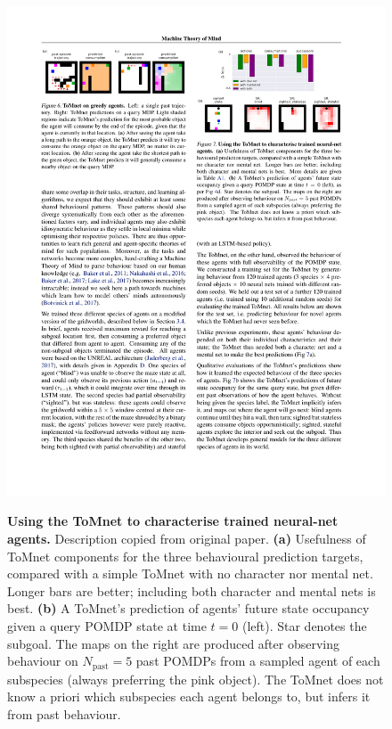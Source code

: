 \documentclass[twocolumn,superscriptaddress,aps]{revtex4-1}
\begin{document}
\begin{figure}[!htb]
\includegraphics[width=\linewidth, height=\textheight, keepaspectratio]{figs/exp3-1}
\label{fig:exp31}
\caption{\textbf{Using the ToMnet to characterise trained neural-net agents.} Description copied from original paper. \textbf{(a)} Usefulness of ToMnet components for the three behavioural prediction targets, compared with a simple ToMnet with no character nor mental net. Longer bars are better; including both character and mental nets is best. \textbf{(b)} A ToMnet’s prediction of agents’ future state occupancy given a query POMDP state at time $t = 0$ (left). Star denotes the subgoal. The maps on the right are produced after observing behaviour on $N_{\text{past}} = 5$ past POMDPs from a sampled agent of each subspecies (always preferring the pink object). The ToMnet does not know a priori which subspecies each agent belongs to, but infers it from past behaviour.}
\end{figure}
\end{document}
